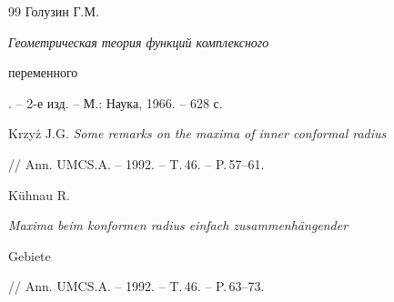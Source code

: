 \begin{thebibliography}{99}
Голузин Г.М. {\em Геометрическая теория функций комплексного


переменного}. -- 2-е изд. -- М.: Наука, 1966. -- 628 с.




Krzy\.z J.G. {\em Some remarks on the maxima of inner conformal radius}


// Ann. UMCS.A. -- 1992. -- T.\,46. -- P.\,57--61.




K\"uhnau R. {\em Maxima beim konformen radius einfach zusammenh\"angender


Gebiete} // Ann. UMCS.A. -- 1992. -- T.\,46. -- P.\,63--73.





\end{thebibliography}





\vskip 2cm









\smallskip









\label{end}





